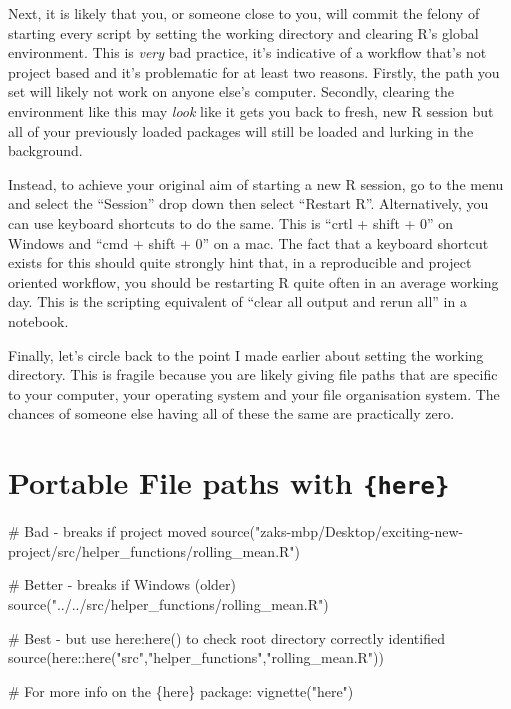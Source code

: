 \documentclass[
  letterpaper,
  DIV=11,
  numbers=noendperiod]{scrreprt}
\newenvironment{Shaded}{\begin{snugshade}}{\end{snugshade}}
\newcommand{\CommentTok}[1]{\textcolor[rgb]{0.37,0.37,0.37}{#1}}
\newcommand{\FunctionTok}[1]{\textcolor[rgb]{0.28,0.35,0.67}{#1}}
\newcommand{\NormalTok}[1]{\textcolor[rgb]{0.00,0.23,0.31}{#1}}
\newcommand{\SpecialCharTok}[1]{\textcolor[rgb]{0.37,0.37,0.37}{#1}}
\newcommand{\StringTok}[1]{\textcolor[rgb]{0.13,0.47,0.30}{#1}}
\begin{document}
Next, it is likely that you, or someone close to you, will commit the
felony of starting every script by setting the working directory and
clearing R's global environment. This is \emph{very} bad practice, it's
indicative of a workflow that's not project based and it's problematic
for at least two reasons. Firstly, the path you set will likely not work
on anyone else's computer. Secondly, clearing the environment like this
may \emph{look} like it gets you back to fresh, new R session but all of
your previously loaded packages will still be loaded and lurking in the
background.

Instead, to achieve your original aim of starting a new R session, go to
the menu and select the ``Session'' drop down then select ``Restart R''.
Alternatively, you can use keyboard shortcuts to do the same. This is
``crtl + shift + 0'' on Windows and ``cmd + shift + 0'' on a mac. The
fact that a keyboard shortcut exists for this should quite strongly hint
that, in a reproducible and project oriented workflow, you should be
restarting R quite often in an average working day. This is the
scripting equivalent of ``clear all output and rerun all'' in a
notebook.

Finally, let's circle back to the point I made earlier about setting the
working directory. This is fragile because you are likely giving file
paths that are specific to your computer, your operating system and your
file organisation system. The chances of someone else having all of
these the same are practically zero.

\section{\texorpdfstring{Portable File paths with
\texttt{\{here\}}}{Portable File paths with \{here\}}}\label{portable-file-paths-with-here}

\begin{Shaded}
\begin{Highlighting}[]
\CommentTok{\# Bad {-} breaks if project moved}
\FunctionTok{source}\NormalTok{(}\StringTok{"zaks{-}mbp/Desktop/exciting{-}new{-}project/src/helper\_functions/rolling\_mean.R"}\NormalTok{)}

\CommentTok{\# Better {-} breaks if Windows (older)}
\FunctionTok{source}\NormalTok{(}\StringTok{"../../src/helper\_functions/rolling\_mean.R"}\NormalTok{)}

\CommentTok{\# Best {-} but use here:here() to check root directory correctly identified}
\FunctionTok{source}\NormalTok{(here}\SpecialCharTok{::}\FunctionTok{here}\NormalTok{(}\StringTok{"src"}\NormalTok{,}\StringTok{"helper\_functions"}\NormalTok{,}\StringTok{"rolling\_mean.R"}\NormalTok{))}

\CommentTok{\# For more info on the \{here\} package:}
\FunctionTok{vignette}\NormalTok{(}\StringTok{"here"}\NormalTok{)}
\end{Highlighting}
\end{Shaded}
\end{document}
